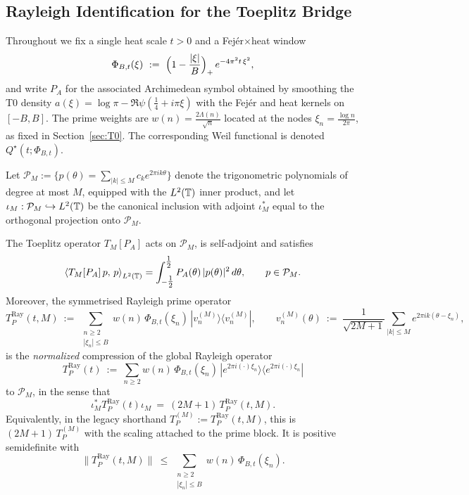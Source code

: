 
\subsection{Rayleigh Identification for the Toeplitz Bridge}\label{subsec:a3-rayleigh}
Throughout we fix a single heat scale $t>0$ and a Fej\'er$\times$heat window
\[
  \Phi_{B,t}(\xi)\ :=\ \Bigl(1-\frac{|\xi|}{B}\Bigr)_{+}\,e^{-4\pi^2 t\,\xi^2},
\]
and write $P_A$ for the associated Archimedean symbol obtained by smoothing the
T0 density $a(\xi)=\log\pi-\Re\psi(\tfrac14+i\pi\xi)$ with the Fej\'er and heat kernels
on $[-B,B]$.  The prime weights are $w(n)=\frac{2\Lambda(n)}{\sqrt n}$ located at the
nodes $\xi_n=\frac{\log n}{2\pi}$, as fixed in Section~\ref{sec:T0}.
The corresponding Weil functional is denoted $Q^\star(t;\Phi_{B,t})$.

Let $\mathcal P_M:=\{p(\theta)=\sum_{|k|\le M}c_k e^{2\pi i k\theta}\}$ denote the trigonometric
polynomials of degree at most $M$, equipped with the $L^2(\mathbb T)$ inner product, and let
$\iota_M:\mathcal P_M\hookrightarrow L^2(\mathbb T)$ be the canonical inclusion with adjoint
$\iota_M^\ast$ equal to the orthogonal projection onto $\mathcal P_M$.

\begin{lemma}\label{lem:a3-model-space}
The Toeplitz operator $T_M[P_A]$ acts on $\mathcal P_M$, is self-adjoint and satisfies
\[
  \left\langle T_M[P_A]\,p,\,p\right\rangle_{L^2(\mathbb T)}
  = \int_{-\tfrac12}^{\tfrac12} P_A(\theta)\,|p(\theta)|^2\,d\theta,
  \qquad p\in\mathcal P_M.
\]
Moreover, the symmetrised Rayleigh prime operator
\[
  T_P^{\mathrm{Ray}}(t,M)\ :=\ \sum_{\substack{n\ge2\\ |\xi_n|\le B}}
     w(n)\,\Phi_{B,t}(\xi_n)\,|v_n^{(M)}\rangle\!\langle v_n^{(M)}|,
  \qquad
  v_n^{(M)}(\theta)\ :=\ \frac{1}{\sqrt{2M+1}}\sum_{|k|\le M} e^{2\pi i k(\theta-\xi_n)},
\]
is the \emph{normalized} compression of the global Rayleigh operator
\[
  T_P^{\mathrm{Ray}}(t)\ :=\ \sum_{n\ge2} w(n)\,\Phi_{B,t}(\xi_n)\,
  |e^{2\pi i(\cdot)\xi_n}\rangle\!\langle e^{2\pi i(\cdot)\xi_n}|
\]
to $\mathcal P_M$, in the sense that
\[
  \iota_M^\ast T_P^{\mathrm{Ray}}(t) \iota_M\ =\ (2M+1)\,T_P^{\mathrm{Ray}}(t,M).
\]
Equivalently, in the legacy shorthand $T_P^{(M)}:=T_P^{\mathrm{Ray}}(t,M)$, this is
$(2M+1)\,T_P^{(M)}$ with the scaling attached to the prime block.
It is positive semidefinite with
\[
  \|T_P^{\mathrm{Ray}}(t,M)\| \ \le\ \sum_{\substack{n\ge2\\ |\xi_n|\le B}} w(n)\,\Phi_{B,t}(\xi_n).
\]
\end{lemma}

